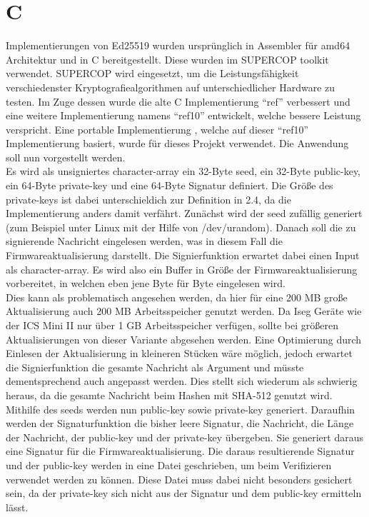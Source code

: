\documentclass[thesis=bachelor,faculty=cb]{hsmw-thesis}
\begin{document}
{	\section{C}
	Implementierungen von Ed25519 wurden ursprünglich \cite{edcrypto} in Assembler für amd64 Architektur und in C bereitgestellt. Diese wurden im SUPERCOP \cite{SUPERCOP} toolkit verwendet.
	SUPERCOP wird eingesetzt, um die Leistungsfähigkeit verschiedenster Kryptografiealgorithmen auf unterschiedlicher Hardware zu testen.
	Im Zuge dessen wurde die alte C Implementierung \enquote{ref} verbessert und eine weitere Implementierung namens \enquote{ref10} entwickelt, welche bessere Leistung verspricht. Eine portable Implementierung \cite{github}, welche auf dieser \enquote{ref10} Implementierung basiert, wurde für dieses Projekt verwendet. Die Anwendung soll nun vorgestellt werden.
	\\[1cm]
	Es wird als unsigniertes character-array ein 32-Byte seed, ein 32-Byte public-key, ein 64-Byte private-key und eine 64-Byte Signatur definiert. Die Größe des private-keys ist dabei unterschieldich zur Definition in 2.4, da die Implementierung anders damit verfährt. Zunächst wird der seed zufällig generiert (zum Beispiel unter Linux mit der Hilfe von /dev/urandom). Danach soll die zu signierende Nachricht eingelesen werden, was in diesem Fall die Firmwareaktualisierung darstellt. Die Signierfunktion erwartet dabei einen Input als character-array. Es wird also ein Buffer in Größe der Firmwareaktualisierung vorbereitet, in welchen eben jene Byte für Byte eingelesen wird. 
	\\[1cm]
	Dies kann als problematisch angesehen werden, da hier für eine 200 MB große Aktualisierung auch 200 MB Arbeitsspeicher genutzt werden. Da Iseg Geräte wie der ICS Mini II nur über 1 GB Arbeitsspeicher verfügen, sollte bei größeren Aktualisierungen von dieser Variante abgesehen werden. Eine Optimierung durch Einlesen der Aktualisierung in kleineren Stücken wäre möglich, jedoch erwartet die Signierfunktion die gesamte Nachricht als Argument und müsste dementsprechend auch angepasst werden. Dies stellt sich wiederum als schwierig heraus, da die gesamte Nachricht beim Hashen mit SHA-512 genutzt wird.
	\\[1cm]
	Mithilfe des seeds werden nun public-key sowie private-key generiert. Daraufhin werden der Signaturfunktion die bisher leere Signatur, die Nachricht, die Länge der Nachricht, der public-key und der private-key übergeben. Sie generiert daraus eine Signatur für die Firmwareaktualisierung. Die daraus resultierende Signatur und der public-key werden in eine Datei geschrieben, um beim Verifizieren verwendet werden zu können. Diese Datei muss dabei nicht besonders gesichert sein, da der private-key sich nicht aus der Signatur und dem public-key ermitteln lässt.
}
\end{document}
